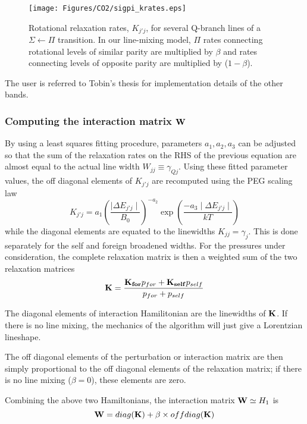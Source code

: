\documentclass[11pt]{article}
\begin{document}
\begin{figure}[h]
\begin{center}
\texttt{[image: Figures/CO2/sigpi\_krates.eps]}
\end{center}
  \caption[Rotational relaxation rates, $K_{j'j}$, for several Q-branch
        lines of a $\Sigma\leftarrow\Pi$ transition.]
        {Rotational relaxation rates, $K_{j'j}$, for several Q-branch
        lines of a $\Sigma\leftarrow\Pi$ transition.  In our line-mixing
        model, $\Pi$ rates connecting rotational levels of similar parity
        are multiplied by $\beta$ and rates connecting levels of opposite 
        parity are multiplied by ($1-\beta$).} 
  \label{fig:sigpi_krates}
\end{figure}

The user is referred to Tobin's thesis \cite{tob:96} for implementation 
details of the other bands. 

\subsubsection{Computing the interaction matrix ${\bf W}$}
By using a least squares fitting procedure, parameters $a_{1},a_{2},a_{3}$
can be adjusted so that the sum of the relaxation rates
on the RHS of the previous equation are almost equal to the 
actual line width $W_{jj}\equiv\gamma_{Qj}$. Using these fitted parameter 
values, the off diagonal elements of $K_{j'j}$ are recomputed using the 
PEG scaling law
\[
 K_{j'j}=a_{1}\left(\frac{\mid\Delta E_{j'j}\mid}{B_{0}}\right)^{-a_{2}}
\exp\left(\frac{-a_{3}\mid\Delta E_{j'j}\mid}{kT}\right)
\]
while the diagonal elements are equated to the linewidths $K_{jj} = 
\gamma_{j}$. This is done separately for the self and foreign broadened 
widths. For the pressures under consideration, the complete relaxation 
matrix  is then a weighted sum of the two relaxation matrices
\[
{\bf K} = \frac{{\bf K_{for}}p_{for} + {\bf K_{self}}p_{self}}
                {p_{for}+p_{self}}
\]

The diagonal elements of interaction Hamilitonian are the linewidths of 
${\bf K}$. If there is no line mixing, the mechanics of the algorithm
will just give a Lorentzian lineshape.

The off diagonal elements of the perturbation or interaction matrix are 
then simply proportional to the off diagonal elements of the relaxation 
matrix; if there is no line mixing ($\beta = 0$), these elements are zero.

Combining the above two Hamiltonians, the interaction matrix 
${\bf W} \simeq H_{1}$ is
\[
{\bf W} = diag({\bf K}) + \beta \times offdiag({\bf K})
\]
\end{document}
